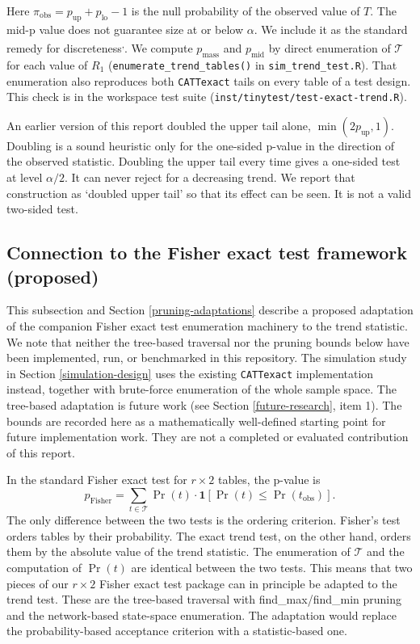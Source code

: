 \documentclass[
  11pt,
]{article}
\begin{document}
Here \(\pi_{\text{obs}} = p_{\text{up}} + p_{\text{lo}} - 1\)
is the null probability of the observed value of \(T\). The
mid-p value does not guarantee size at or below \(\alpha\).
We include it as the standard remedy for discreteness\textsuperscript{,}. We
compute \(p_{\text{mass}}\) and \(p_{\text{mid}}\) by direct
enumeration of \(\mathcal{T}\) for each value of \(R_1\)
(\texttt{enumerate\_trend\_tables()} in \texttt{sim\_trend\_test.R}). That
enumeration also reproduces both \texttt{CATTexact} tails on
every table of a test design. This check is in the
workspace test suite (\texttt{inst/tinytest/test-exact-trend.R}).

An earlier version of this report doubled the upper tail
alone, \(\min(2 p_{\text{up}}, 1)\). Doubling is a sound
heuristic only for the one-sided p-value in the direction
of the observed statistic. Doubling the upper
tail every time gives a one-sided test at level
\(\alpha/2\). It can never reject for a decreasing trend.
We report that construction as `doubled upper tail' so
that its effect can be seen. It is not a valid two-sided
test.

\subsection{Connection to the Fisher exact test framework (proposed)}\label{connection-to-the-fisher-exact-test-framework-proposed}

This subsection and Section \ref{pruning-adaptations}
describe a proposed adaptation of the companion Fisher
exact test enumeration machinery to the trend statistic.
We note that neither the tree-based traversal nor the
pruning bounds below have been implemented, run, or
benchmarked in this repository. The simulation study in
Section \ref{simulation-design} uses the existing
\texttt{CATTexact} implementation instead, together with
brute-force enumeration of the whole sample space. The
tree-based adaptation is future work (see Section
\ref{future-research}, item 1). The bounds are recorded
here as a mathematically well-defined starting point for
future implementation work. They are not a completed or
evaluated contribution of this report.

In the standard Fisher exact test for \(r \times 2\)
tables, the p-value is
\[p_{\text{Fisher}} = \sum_{t \in \mathcal{T}}
    \Pr(t) \cdot
    \mathbf{1}\!\left[\Pr(t) \leq \Pr(t_{\text{obs}})
    \right].\]
The only difference between the two tests is the
ordering criterion. Fisher's test orders tables by their
probability. The exact trend test, on the other hand,
orders them by the absolute value of the trend statistic.
The enumeration of \(\mathcal{T}\) and the computation of
\(\Pr(t)\) are identical between the two tests. This means
that two pieces of our \(r \times 2\) Fisher exact test
package can in principle be adapted to the trend test.
These are the tree-based traversal with
find\_max/find\_min pruning and the network-based
state-space enumeration. The adaptation
would replace the probability-based acceptance criterion
with a statistic-based one.
\end{document}
